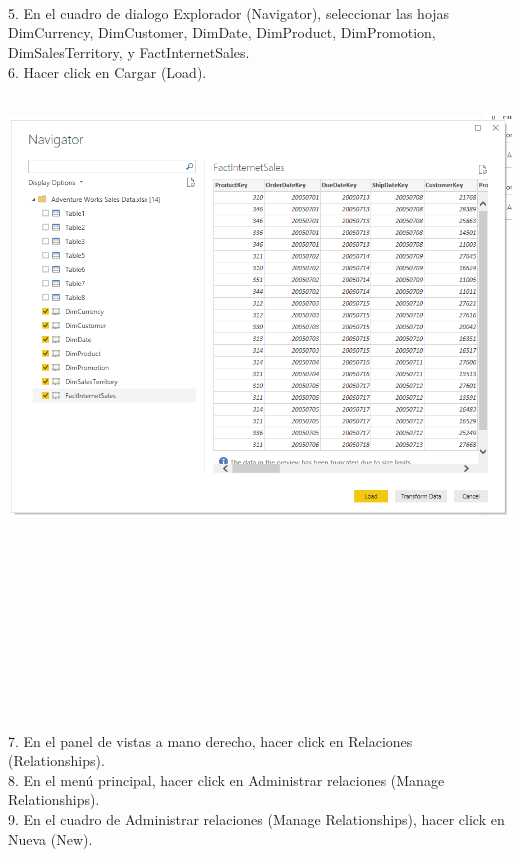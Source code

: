 \begin{flushleft}
\begin{itemize}
\textbf{ }\\
\textbf{ }\\
\textbf{ }\\
5. En el cuadro de dialogo Explorador (Navigator), seleccionar las hojas DimCurrency, DimCustomer,
DimDate, DimProduct, DimPromotion, DimSalesTerritory, y FactInternetSales.\\
6. Hacer click en Cargar (Load).\\
\textbf{ }\\
\begin{center}
	\includegraphics[width=20cm]{./Imagenes/img2} 
	\end{center}
\textbf{ }\\
\textbf{ }\\
\textbf{ }\\
\textbf{ }\\
\textbf{ }\\
\textbf{ }\\
\textbf{ }\\
\textbf{ }\\
\textbf{ }\\
\textbf{ }\\
7. En el panel de vistas a mano derecho, hacer click en Relaciones (Relationships).\\
8. En el menú principal, hacer click en Administrar relaciones (Manage Relationships).\\
9. En el cuadro de Administrar relaciones (Manage Relationships), hacer click en Nueva (New).\\
\textbf{ }\\

\end{itemize}
\end{flushleft}
